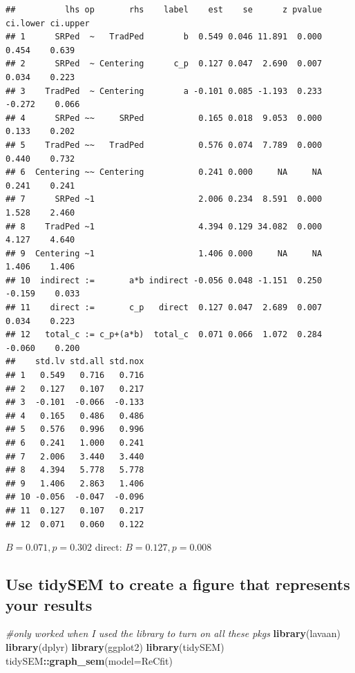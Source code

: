 \documentclass[
  11pt,
]{book}
\newenvironment{Shaded}{\begin{snugshade}}{\end{snugshade}}
\newcommand{\AttributeTok}[1]{\textcolor[rgb]{0.27,0.27,0.27}{#1}}
\newcommand{\CommentTok}[1]{\textcolor[rgb]{0.37,0.37,0.37}{\textit{#1}}}
\newcommand{\FunctionTok}[1]{\textcolor[rgb]{0.27,0.27,0.27}{\textbf{#1}}}
\newcommand{\NormalTok}[1]{#1}
\newcommand{\SpecialCharTok}[1]{\textcolor[rgb]{0.43,0.43,0.43}{\textbf{#1}}}
\begin{document}
\begin{verbatim}
##          lhs op       rhs    label    est    se      z pvalue ci.lower ci.upper
## 1      SRPed  ~   TradPed        b  0.549 0.046 11.891  0.000    0.454    0.639
## 2      SRPed  ~ Centering      c_p  0.127 0.047  2.690  0.007    0.034    0.223
## 3    TradPed  ~ Centering        a -0.101 0.085 -1.193  0.233   -0.272    0.066
## 4      SRPed ~~     SRPed           0.165 0.018  9.053  0.000    0.133    0.202
## 5    TradPed ~~   TradPed           0.576 0.074  7.789  0.000    0.440    0.732
## 6  Centering ~~ Centering           0.241 0.000     NA     NA    0.241    0.241
## 7      SRPed ~1                     2.006 0.234  8.591  0.000    1.528    2.460
## 8    TradPed ~1                     4.394 0.129 34.082  0.000    4.127    4.640
## 9  Centering ~1                     1.406 0.000     NA     NA    1.406    1.406
## 10  indirect :=       a*b indirect -0.056 0.048 -1.151  0.250   -0.159    0.033
## 11    direct :=       c_p   direct  0.127 0.047  2.689  0.007    0.034    0.223
## 12   total_c := c_p+(a*b)  total_c  0.071 0.066  1.072  0.284   -0.060    0.200
##    std.lv std.all std.nox
## 1   0.549   0.716   0.716
## 2   0.127   0.107   0.217
## 3  -0.101  -0.066  -0.133
## 4   0.165   0.486   0.486
## 5   0.576   0.996   0.996
## 6   0.241   1.000   0.241
## 7   2.006   3.440   3.440
## 8   4.394   5.778   5.778
## 9   1.406   2.863   1.406
## 10 -0.056  -0.047  -0.096
## 11  0.127   0.107   0.217
## 12  0.071   0.060   0.122
\end{verbatim}

\(B = 0.071, p = 0.302\) direct: \(B = 0.127, p = 0.008\)

\hypertarget{use-tidysem-to-create-a-figure-that-represents-your-results}{%
\subsection*{Use tidySEM to create a figure that represents your results}\label{use-tidysem-to-create-a-figure-that-represents-your-results}}


\begin{Shaded}
\begin{Highlighting}[]
\CommentTok{\#only worked when I used the library to turn on all these pkgs}
\FunctionTok{library}\NormalTok{(lavaan)}
\FunctionTok{library}\NormalTok{(dplyr)}
\FunctionTok{library}\NormalTok{(ggplot2)}
\FunctionTok{library}\NormalTok{(tidySEM)}
\NormalTok{tidySEM}\SpecialCharTok{::}\FunctionTok{graph\_sem}\NormalTok{(}\AttributeTok{model=}\NormalTok{ReCfit)}
\end{Highlighting}
\end{Shaded}
\end{document}
